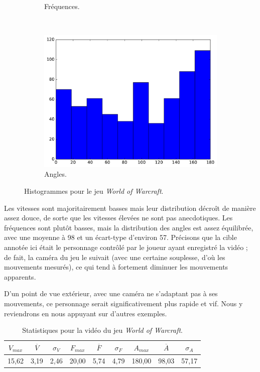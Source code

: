 \begin{figure}[!htbp]
\begin{subfigure}[t]{\subImgWclicks}
			\caption{Fréquences.}
			\label{fig:wow_frequency}
		\end{subfigure}
		~
		\begin{subfigure}[t]{\subImgWclicks}
			\centering
			\includegraphics[width=\textwidth]{figures/ch3/wow_angle}
			\caption{Angles.}
			\label{fig:wow_angle}
		\end{subfigure}
		\caption[Histogrammes pour le jeu \emph{World of Warcraft}]{Histogrammes pour le jeu \emph{World of Warcraft}.}
		\label{fig:histWow}
	\end{figure}
	
	Les vitesses sont majoritairement basses mais leur distribution décroît de manière assez douce, de sorte que les vitesses élevées ne sont pas anecdotiques. Les fréquences sont plutôt basses, mais la distribution des angles est assez équilibrée, avec une moyenne à 98\textdegree{} et un écart-type d'environ 57\textdegree{}. Précisons que la cible annotée ici était le personnage contrôlé par le joueur ayant enregistré la vidéo ; de fait, la caméra du jeu le suivait (avec une certaine souplesse, d'où les mouvements mesurés), ce qui tend à fortement diminuer les mouvements apparents.
	
	D'un point de vue extérieur, avec une caméra ne s'adaptant pas à ses mouvements, ce personnage serait significativement plus rapide et vif. Nous y reviendrons en nous appuyant sur d'autres exemples.
	
\begin{table}
	\centering
	\begin{tabular}{c c c c c c c c c}
		$V_{max}$	& $\overline{V}$	& $\sigma_{V}$	& $F_{max}$	& $\overline{F}$	& $\sigma_{F}$	& $A_{max}$	& $\overline{A}$	& $\sigma_{A}$	\bigstrut[b] \\ \hline

		15,62		& 3,19				& 2,46			& 20,00		& 5,74				& 4,79			& 180,00	& 98,03				& 57,17			\bigstrut[t] \\
	\end{tabular}
	\caption[Statistiques pour la vidéo du jeu \emph{World of Warcraft}]{Statistiques pour la vidéo du jeu \emph{World of Warcraft}.}
	\label{tab:wow_stats}
\end{table}

